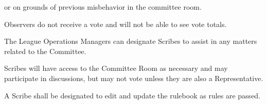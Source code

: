 \begin{deepEnumerate}
\begin{deepEnumerate}
        or on grounds of previous misbehavior in the committee room.
        \item Observers do not receive a vote and will not be able to see vote totals.
    \end{deepEnumerate}
    \item The League Operations Managers can designate Scribes to assist in any matters related to the Committee.
    \begin{deepEnumerate}
        \item Scribes will have access to the Committee Room as necessary and may participate in discussions, but may not vote unless they are also a Representative.
        \item A Scribe shall be designated to edit and update the rulebook as rules are passed.
    \end{deepEnumerate}
\end{deepEnumerate}
    
